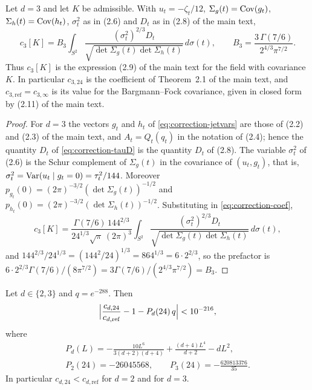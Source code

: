 \begin{lemma}[the case $d=3$]\label{lem:correction-d3}
Let $d=3$ and let $K$ be admissible. With $u_t=-\zeta_t/12$, $\Sigma_g(t)=\operatorname{Cov}(g_t)$, $\Sigma_h(t)=\operatorname{Cov}(h_t)$, $\sigma_t^2$ as in (2.6) and $D_t$ as in (2.8) of the main text,
\begin{equation}\label{eq:correction-d3}
c_3[K]=B_3\int_{S^2}\frac{(\sigma_t^2)^{2/3}D_t}{\sqrt{\det\Sigma_g(t)\det\Sigma_h(t)}}\,d\sigma(t),\qquad B_3=\frac{3\,\Gamma(7/6)}{2^{4/3}\pi^{7/2}} .
\end{equation}
Thus $c_3[K]$ is the expression (2.9) of the main text for the field with covariance $K$. In particular $c_{3,24}$ is the coefficient of Theorem~2.1 of the main text, and $c_{3,\mathrm{ref}}=c_{3,\infty}$ is its value for the Bargmann--Fock covariance, given in closed form by (2.11) of the main text.
\end{lemma}

\begin{proof}
For $d=3$ the vectors $g_t$ and $h_t$ of \eqref{eq:correction-jetvars} are those of (2.2) and (2.3) of the main text, and $A_t=Q_t(q_t)$ in the notation of (2.4); hence the quantity $D_t$ of \eqref{eq:correction-tauD} is the quantity $D_t$ of (2.8). The variable $\sigma_t^2$ of (2.6) is the Schur complement of $\Sigma_g(t)$ in the covariance of $(u_t,g_t)$, that is, $\sigma_t^2=\operatorname{Var}(u_t\mid g_t=0)=\tau_t^2/144$. Moreover $p_{g_t}(0)=(2\pi)^{-3/2}(\det\Sigma_g(t))^{-1/2}$ and $p_{h_t}(0)=(2\pi)^{-3/2}(\det\Sigma_h(t))^{-1/2}$. Substituting in \eqref{eq:correction-coef},
\[
c_3[K]=\frac{\Gamma(7/6)\,144^{2/3}}{24^{1/3}\sqrt\pi\,(2\pi)^3}\int_{S^2}\frac{(\sigma_t^2)^{2/3}D_t}{\sqrt{\det\Sigma_g(t)\det\Sigma_h(t)}}\,d\sigma(t),
\]
and $144^{2/3}/24^{1/3}=(144^2/24)^{1/3}=864^{1/3}=6\cdot2^{2/3}$, so the prefactor is $6\cdot2^{2/3}\Gamma(7/6)/(8\pi^{7/2})=3\Gamma(7/6)/(2^{4/3}\pi^{7/2})=B_3$.
\end{proof}

\begin{theorem}\label{thm:correction-main}
Let $d\in\{2,3\}$ and $q=e^{-288}$. Then
\begin{equation}\label{eq:correction-main}
\Bigl|\frac{c_{d,24}}{c_{d,\mathrm{ref}}}-1-P_d(24)\,q\Bigr|<10^{-216},
\end{equation}
where
\begin{equation}\label{eq:correction-Pd}
\begin{gathered}
P_d(L)=-\frac{10L^6}{3(d+2)(d+4)}+\frac{(d+4)L^4}{d+2}-dL^2,\\
P_2(24)=-26045568,\qquad P_3(24)=-\frac{620813376}{35}.
\end{gathered}
\end{equation}
In particular $c_{d,24}<c_{d,\mathrm{ref}}$ for $d=2$ and for $d=3$.
\end{theorem}

